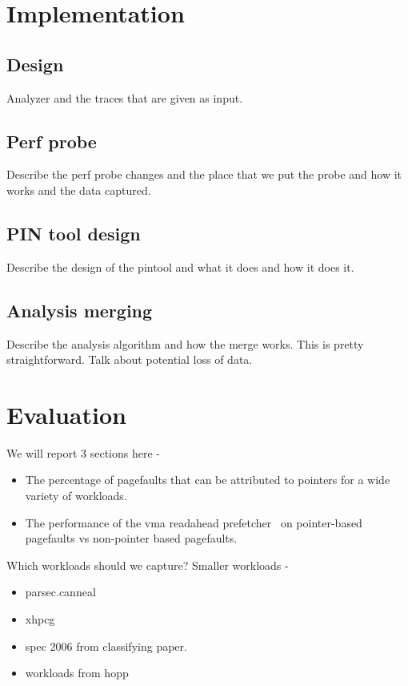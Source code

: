 
\section{Implementation}

\subsection{Design} 
Analyzer and the traces that are given as input. 

\subsection{Perf probe}
Describe the perf probe changes and the place that we put the probe and how it works and the data captured. 

\subsection{PIN tool design}
Describe the design of the pintool and what it does and how it does it. 

\subsection{Analysis merging}
Describe the analysis algorithm and how the merge works. This is pretty straightforward. Talk about potential loss of data.


\section{Evaluation}
We will report 3 sections here - 
\begin{itemize}
    \item The percentage of pagefaults that can be attributed to pointers for a wide variety of workloads.
    \item The performance of the vma readahead prefetcher~\cite{vma-readahead} on pointer-based pagefaults vs non-pointer based pagefaults.
\end{itemize}

Which workloads should we capture?
Smaller workloads - 
\begin{itemize}
    \item parsec.canneal 
    \item xhpcg
    \item spec 2006 from classifying paper. 
    \item workloads from hopp
\end{itemize}

